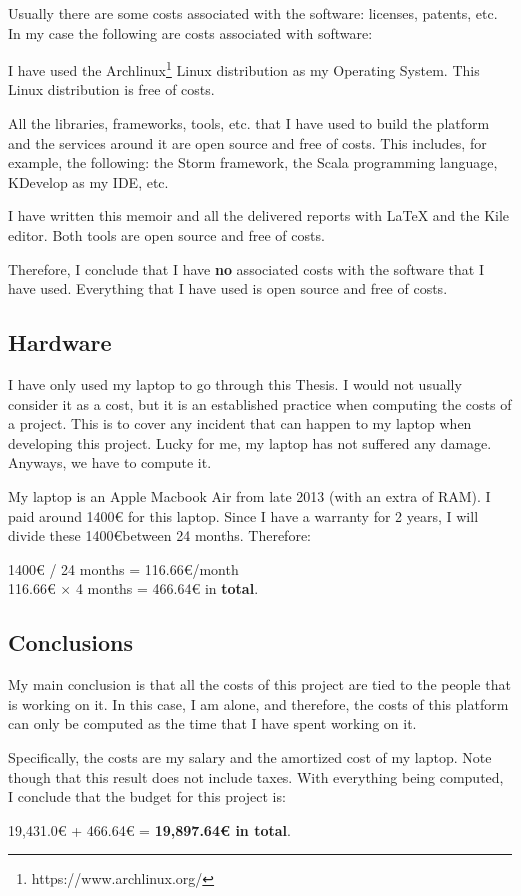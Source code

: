 Usually there are some costs associated with the software: licenses, patents,
etc. In my case the following are costs associated with software:

\mylist
  \item I have used the Archlinux\footnote{https://www.archlinux.org/} Linux
distribution as my Operating System. This Linux distribution is free of costs.
  \item All the libraries, frameworks, tools, etc. that I have used to build
the platform and the services around it are open source and free of costs. This
includes, for example, the following: the Storm framework, the Scala
programming language, KDevelop as my IDE, etc.
  \item I have written this memoir and all the delivered reports with \LaTeX{}
and the Kile editor. Both tools are open source and free of costs.
\mylistend

Therefore, I conclude that I have {\bf no} associated costs with the software
that I have used. Everything that I have used is open source and free of costs.

\subsection{Hardware}

I have only used my laptop to go through this Thesis. I would not usually
consider it as a cost, but it is an established practice when computing the
costs of a project. This is to cover any incident that can happen to my laptop
when developing this project. Lucky for me, my laptop has not suffered any
damage. Anyways, we have to compute it.

My laptop is an Apple Macbook Air from late 2013 (with an extra of RAM). I paid
around 1400\euro{} for this laptop. Since I have a warranty for 2 years, I will
divide these 1400\euro between 24 months. Therefore:

\begin{center}
  1400\euro{} / 24 months = 116.66\euro{}/month \\
  116.66\euro{} $\times$ 4 months = 466.64\euro{} in {\bf total}.
\end{center}


\subsection{Conclusions}

My main conclusion is that all the costs of this project are tied to the people
that is working on it. In this case, I am alone, and therefore, the costs of
this platform can only be computed as the time that I have spent working on it.

Specifically, the costs are my salary and the amortized cost of my laptop. Note
though that this result does not include taxes. With everything being computed,
I conclude that the budget for this project is:

\begin{center}
  19,431.0\euro{} + 466.64\euro{} = {\bf 19,897.64\euro{} in total}.
\end{center}
